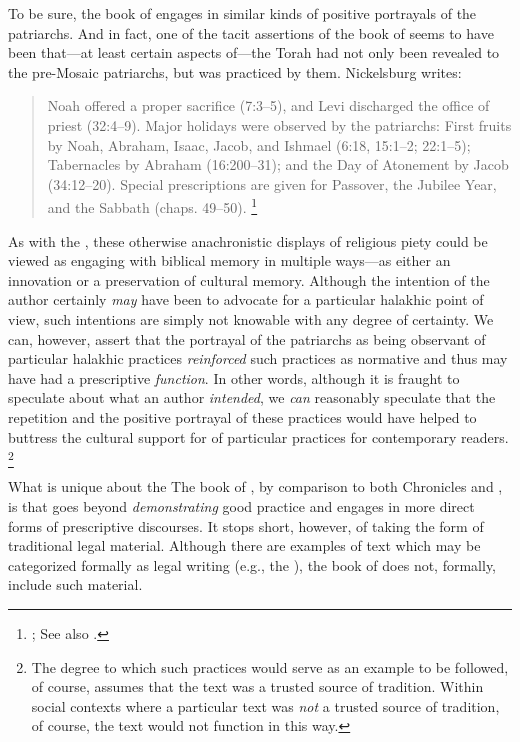 To be sure, the book of \jub engages in similar kinds of positive portrayals of the patriarchs. And in fact, one of the tacit assertions of the book of \jub seems to have been that---at least certain aspects of---the Torah had not only been revealed to the pre-Mosaic patriarchs, but was practiced by them. Nickelsburg writes:
    \begin{quote}
        Noah offered a proper sacrifice (7:3--5), and Levi discharged the office of priest (32:4--9). Major holidays were observed by the patriarchs: First fruits by Noah, Abraham, Isaac, Jacob, and Ishmael (6:18, 15:1--2; 22:1--5); Tabernacles by Abraham (16:200--31); and the Day of Atonement by Jacob (34:12--20). Special prescriptions are given for Passover, the Jubilee Year, and the Sabbath (chaps. 49--50).%
        \footnote{\cite[69]{nickelsburg2005};
            See also \cite[70]{crawford2008}.}
    \end{quote}
\noindent
As with the \ga, these otherwise anachronistic displays of religious piety could be viewed as engaging with biblical memory in multiple ways---as either an innovation or a preservation of cultural memory. Although the intention of the author certainly \emph{may} have been to advocate for a particular halakhic point of view, such intentions are simply not knowable with any degree of certainty. We can, however, assert that the portrayal of the patriarchs as being observant of particular halakhic practices \emph{reinforced} such practices as normative and thus may have had a prescriptive \emph{function}. In other words, although it is fraught to speculate about what an author \emph{intended}, we \emph{can} reasonably speculate that the repetition and the positive portrayal of these practices would have helped to buttress the cultural support for of particular practices for contemporary readers.
    \footnote{The degree to which such practices would serve as an example to be followed, of course, assumes that the text was a trusted source of tradition. Within social contexts where a particular text was \emph{not} a trusted source of tradition, of course, the text would not function in this way.}

What is unique about the The book of \jub, by comparison to both Chronicles and \ga, is that \jub goes beyond \emph{demonstrating} good practice and engages in more direct forms of prescriptive discourses. It stops short, however, of taking the form of traditional legal material. Although there are examples of \rwb text which may be categorized formally as legal writing (e.g., the \templescroll\autocite{fraade_goldstein-etal2017}), the book of \jub does not, formally, include such material. 

